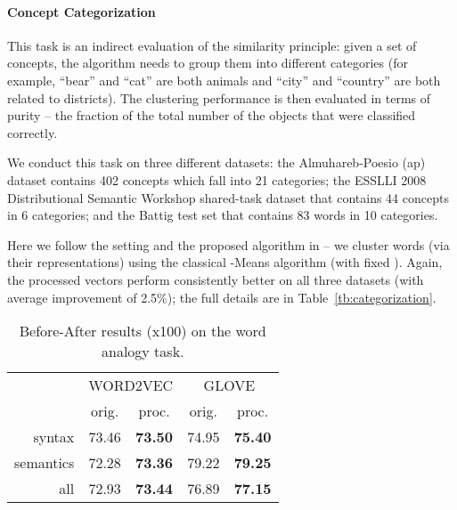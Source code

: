 \documentclass{article} \usepackage{acl2017,times}
\begin{document}
\paragraph{Concept Categorization}

This task is an indirect evaluation of the similarity principle: given a set of concepts, the algorithm needs to group them into different categories (for example, ``bear'' and ``cat'' are both animals and ``city'' and ``country'' are both related to districts). The clustering performance is then evaluated in terms of purity \citep{manning2008introduction} -- the fraction of the total number of the objects that were classified correctly.  


We conduct this task on three different datasets: the Almuhareb-Poesio (ap) dataset \citep{almuhareb2006attributes} contains 402 concepts which fall into 21 categories; the ESSLLI 2008 Distributional Semantic Workshop shared-task dataset \citep{baroni2008bridging} that contains 44 concepts in 6 categories; and the Battig test set \citep{baroni2010distributional} that contains 83 words in 10 categories. 

Here we follow the setting and the proposed algorithm in \citep{baroni2014don,schnabel2015evaluation} --   we cluster words (via their representations)  using the classical -Means algorithm (with fixed ).
Again, the processed vectors perform consistently better on all three datasets (with average improvement of 2.5\%); the full details are in   Table~\ref{tb:categorization}.

\begin{wraptable}{l}{0.48\textwidth}
\vspace{-10pt}
\begin{tabular}{|r||c|c||c|c|}
\hline
\multirow{2}{*}{} & \multicolumn{2}{c||}{WORD2VEC} & \multicolumn{2}{c|}{GLOVE} \\ \cline{2-5} 
                  & orig.      & proc.     & orig.    & proc.    \\ \hline
syntax &     73.46 &      \bf 73.50 &  74.95   & \bf 75.40   \\ \hline
semantics &     72.28 &    \bf  73.36 &   79.22  & \bf 79.25  \\ \hline
all  &     72.93 &    \bf 73.44 &   76.89  & \bf 77.15  \\ \hline
\end{tabular}
\caption{Before-After results (x100) on the word analogy task.}
\label{tb:analogy}
\vspace{-10pt}
\end{wraptable}
\end{document}
